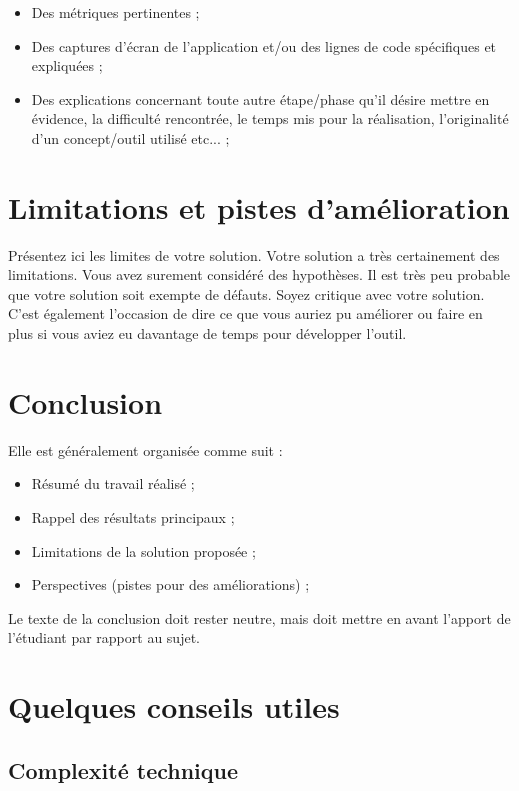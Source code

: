 \documentclass{HELBreport}
\begin{document}
\begin{itemize}
    \item Des métriques pertinentes ;
    \item Des captures d’écran de l’application et/ou des lignes de code spécifiques et
expliquées ;
    \item Des explications concernant toute autre étape/phase qu’il désire mettre en 
évidence, la difficulté rencontrée, le temps mis pour la réalisation, l’originalité
d’un concept/outil utilisé etc... ;
\end{itemize}

\chapter{Limitations et pistes d'amélioration}

Présentez ici les limites de votre solution. Votre solution a très certainement des limitations. Vous avez surement considéré des hypothèses. Il est très peu probable que votre solution soit exempte de défauts. Soyez critique avec votre solution. C'est également l'occasion de dire ce que vous auriez pu améliorer ou faire en plus si vous aviez eu davantage de temps pour développer l'outil.

\chapter{Conclusion}

Elle est généralement organisée comme suit :

\begin{itemize}
    \item Résumé du travail réalisé ;
    \item Rappel des résultats principaux ;
    \item Limitations de la solution proposée ;
    \item Perspectives (pistes pour des améliorations) ;
\end{itemize}

Le texte de la conclusion doit rester neutre, mais doit mettre en avant l’apport de l’étudiant par rapport au sujet.

\chapter{Quelques conseils utiles}

\section*{Complexité technique}
\end{document}
